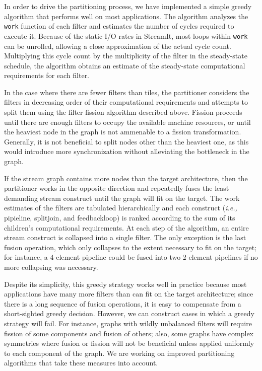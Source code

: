 In order to drive the partitioning process, we have implemented a
simple greedy algorithm that performs well on most applications.  The
algorithm analyzes the {\tt work} function of each filter and
estimates the number of cycles required to execute it.  Because of the
static I/O rates in StreamIt, most loops within {\tt work} can be
unrolled, allowing a close approximation of the actual cycle count.
Multiplying this cycle count by the multiplicity of the filter in the
steady-state schedule, the algorithm obtains an estimate of the
steady-state computational requirements for each filter.

In the case where there are fewer filters than tiles, the partitioner
considers the filters in decreasing order of their computational
requirements and attempts to split them using the filter fission
algorithm described above.  Fission proceeds until there are enough
filters to occupy the available machine resources, or until the
heaviest node in the graph is not ammenable to a fission
transformation.  Generally, it is not beneficial to split nodes other
than the heaviest one, as this would introduce more synchronization
without alleviating the bottleneck in the graph.

If the stream graph contains more nodes than the target architecture,
then the partitioner works in the opposite direction and repeatedly
fuses the least demanding stream construct until the graph will fit on
the target.  The work estimates of the filters are tabulated
hierarchically and each construct ({\it i.e.,} pipieline, splitjoin,
and feedbackloop) is ranked according to the sum of its children's
computational requirements.  At each step of the algorithm, an entire
stream construct is collapsed into a single filter.  The only
exception is the last fusion operation, which only collapses to the
extent necessary to fit on the target; for instance, a 4-element
pipeline could be fused into two 2-element pipelines if no more
collapsing was necessary.

Despite its simplicity, this greedy strategy works well in practice
because most applications have many more filters than can fit on the
target architecture; since there is a long sequence of fusion
operations, it is easy to compensate from a short-sighted greedy
decision.  However, we can construct cases in which a greedy strategy
will fail.  For instance, graphs with wildly unbalanced filters will
require fission of some components and fusion of others; also, some
graphs have complex symmetries where fusion or fission will not be
beneficial unless applied uniformly to each component of the graph.
We are working on improved partitioning algorithms that take these
measures into account.
